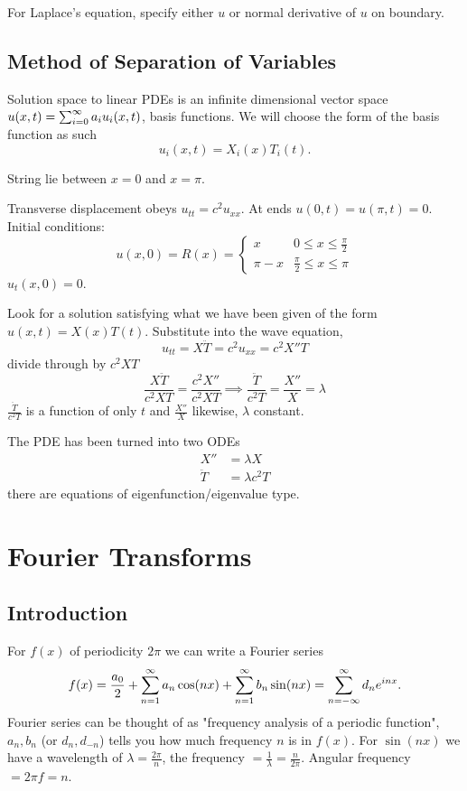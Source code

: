 \documentclass[10pt, a4paper]{article}
\begin{document}
For Laplace's equation,
specify either $u$ or normal derivative of $u$ on boundary.

\subsection{Method of Separation of Variables}
Solution space to linear PDEs is an infinite dimensional vector space
$u(x, t) = \infsum[i = 0] a_iu_i(x, t)$,
basis functions.
We will choose the form of the basis function as such
\[
u_i(x, t) = X_i(x)T_i(t).
\]

\begin{example}
    String lie between $x = 0$ and $x = \pi$.

    Transverse displacement obeys $u_{tt} = c ^ 2u_{xx}$.
    At ends $u(0, t) = u(\pi, t) = 0$.
    Initial conditions:
    \[
    u(x, 0) = R(x) = \begin{cases}
        x & 0 \leq x \leq \frac{\pi}{2} \\
        \pi - x & \frac{\pi}{2} \leq x \leq \pi
    \end{cases}
    \]
    $u_t(x, 0) = 0$.

    \begin{solution}
        Look for a solution satisfying what we have been given of the form $u(x, t) = X(x)T(t)$.
        Substitute into the wave equation,
        \[
        u_{tt} = X\ddot{T} = c ^ 2u_{xx} = c ^ 2X''T
        \]
        divide through by $c ^ 2XT$
        \[
        \frac{X\ddot{T}}{c ^ 2XT} = \frac{c ^ 2X''}{c ^ 2XT} \implies \frac{\ddot{T}}{c ^ 2T} = \frac{X''}{X} = \lambda
        \]
        $\frac{\ddot{T}}{c ^ 2T}$ is a function of only $t$ and $\frac{X''}{X}$ likewise,
        $\lambda$ constant.

        The PDE has been turned into two ODEs
        \begin{align*}
            X'' &= \lambda X \\
            \ddot{T} &= \lambda c ^ 2T
        \end{align*}
        there are equations of eigenfunction/eigenvalue type.
    \end{solution}
\end{example}

\newpage

\section{Fourier Transforms}

\subsection{Introduction}
For $f(x)$ of periodicity $2\pi$ we can write a Fourier series
\[
f(x) = \frac{a_0}{2} + \infsum[n = 1]a_n\cos(nx) + \infsum[n = 1]b_n\sin(nx) = \infsum[n = -\infty]d_ne ^ {inx}.
\]
Fourier series can be thought of as "frequency analysis of a periodic function",
$a_n, b_n$
(or $d_n, d_{-n}$)
tells you how much frequency $n$ is in $f(x)$.
For $\sin(nx)$ we have a wavelength of $\lambda = \frac{2\pi}{n}$,
the frequency $= \frac{1}{\lambda} = \frac{n}{2\pi}$.
Angular frequency $= 2\pi f = n$.
\end{document}
